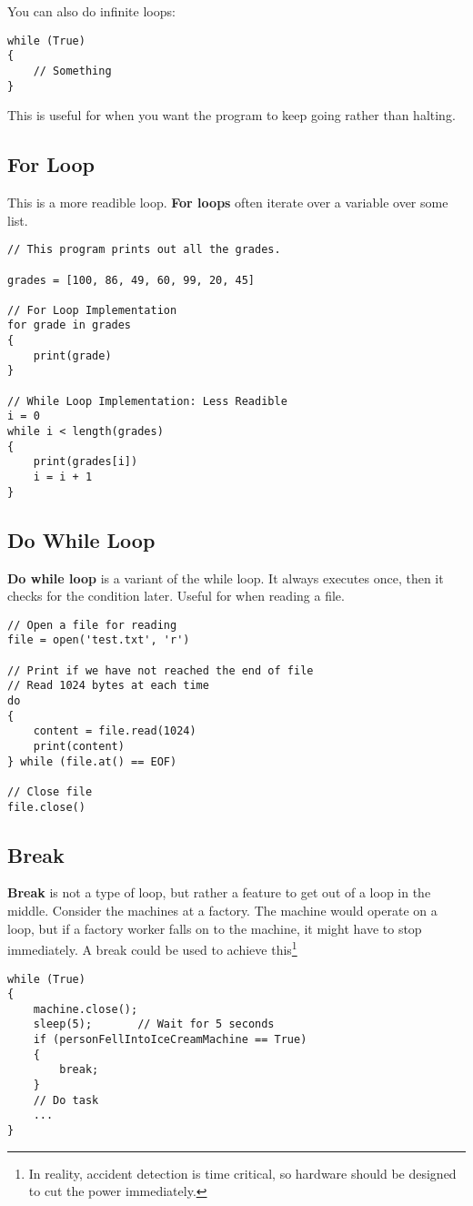 \documentclass[12pt, a4paper]{article}
\theoremstyle{definition}
\begin{document}
You can also do infinite loops:
\begin{lstlisting}
while (True)
{
    // Something
}
\end{lstlisting}
This is useful for when you want the program to keep going rather than halting.

\subsection{For Loop}
This is a more readible loop.
\textbf{For loops} often iterate over a variable over some list.
\begin{lstlisting}
// This program prints out all the grades.

grades = [100, 86, 49, 60, 99, 20, 45]

// For Loop Implementation
for grade in grades
{
    print(grade)
}

// While Loop Implementation: Less Readible
i = 0
while i < length(grades)
{
    print(grades[i])
    i = i + 1
}
\end{lstlisting}

\subsection{Do While Loop}
\textbf{Do while loop} is a variant of the while loop.
It always executes once, then it checks for the condition later.
Useful for when reading a file.
\begin{lstlisting}
// Open a file for reading
file = open('test.txt', 'r')

// Print if we have not reached the end of file
// Read 1024 bytes at each time
do
{
    content = file.read(1024)
    print(content)
} while (file.at() == EOF)

// Close file
file.close()
\end{lstlisting}

\subsection{Break}
\textbf{Break} is not a type of loop, but rather a feature to get out of a loop in the middle.
Consider the machines at a factory.
The machine would operate on a loop, but if a factory worker falls on to the machine,
it might have to stop immediately.
A break could be used to achieve this\footnote{In reality, accident detection is time critical, so hardware should be designed to cut the power immediately.}
\begin{lstlisting}
while (True)
{
    machine.close();
    sleep(5);       // Wait for 5 seconds
    if (personFellIntoIceCreamMachine == True)
    {
        break;
    }
    // Do task
    ...
}
\end{lstlisting}
\end{document}
